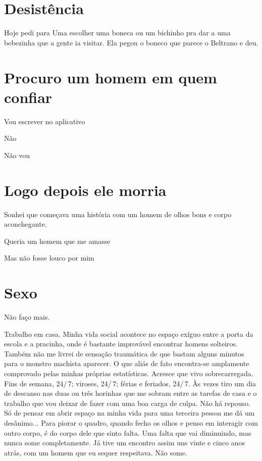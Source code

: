\chapter{Desistência}

Hoje pedi para Uma escolher uma boneca ou um bichinho pra dar a uma
bebezinha que a gente ia visitar. Ela pegou o boneco que parece o
Beltrano e deu.

\chapter{Procuro um homem em quem confiar}

Vou escrever no aplicativo

Não

Não vou

\chapter{Logo depois ele morria}

Sonhei que começava uma história com um homem de olhos bons e corpo
aconchegante.

Queria um homem que me amasse

Mas não fosse louco por mim

\chapter{Sexo}

Não faço mais.

Trabalho em casa. Minha vida social acontece no espaço exíguo entre a
porta da escola e a pracinha, onde é bastante improvável encontrar
homens solteiros. Também não me livrei de sensação traumática de que
bastam alguns minutos para o monstro machista aparecer. O que aliás de
fato encontra-se amplamente comprovado pelas minhas próprias
estatísticas. Acresce que vivo sobrecarregada. Fins de semana, 24/\,7;
viroses, 24/\,7; férias e feriados, 24/\,7. Às vezes tiro um dia de descanso
nas duas ou três horinhas que me sobram entre as tarefas de casa e o
trabalho que vou deixar de fazer com uma boa carga de culpa. Não há
repouso. Só de pensar em abrir espaço na minha vida para uma terceira
pessoa me dá um desânimo... Para piorar o quadro, quando fecho os olhos
e penso em interagir com outro corpo, é do corpo dele que sinto falta.
Uma falta que vai diminuindo, mas nunca some completamente. Já tive um
encontro assim uns vinte e cinco anos atrás, com um homem que eu sequer
respeitava. Não some.

